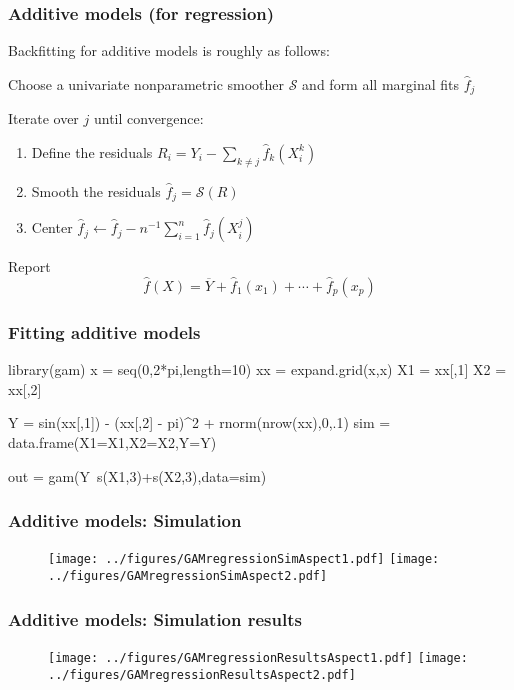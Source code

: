 \documentclass[12pt]{beamer}
\begin{document}
\begin{frame}[fragile]
\frametitle{Additive models (for regression)}
Backfitting for additive models is roughly as follows:

\vsp
Choose a univariate nonparametric smoother $\mathcal{S}$ and form all marginal fits $\hat{f}_j$


\vsp
Iterate over $j$ until convergence:
\begin{enumerate}
\item Define the residuals $R_i = Y_i - \sum_{k \neq j} \hat{f}_k(X_{i}^k)$
\item Smooth the residuals $\hat{f}_j = \mathcal{S}(R)$
\item Center $\hat{f}_j \leftarrow \hat{f}_j - n^{-1}\sum_{i=1}^n \hat{f}_j(X_{i}^j)$
\end{enumerate}
Report
\[
\hat{f}(X) = \overline{Y} + \hat{f}_1(x_1)+\cdots+ \hat{f}_p(x_p)
\]
\end{frame}

\begin{frame}[fragile]
\frametitle{Fitting additive models }
\begin{blockcode}
library(gam)
x   = seq(0,2*pi,length=10)
xx = expand.grid(x,x)
X1 = xx[,1]
X2 = xx[,2]

Y =  sin(xx[,1]) - (xx[,2] - pi)^2 + rnorm(nrow(xx),0,.1)
sim = data.frame(X1=X1,X2=X2,Y=Y)

out = gam(Y~s(X1,3)+s(X2,3),data=sim)
\end{blockcode}
\end{frame}



\begin{frame}[fragile]
\frametitle{Additive models: Simulation}
\begin{figure}
\centering
\texttt{[image: ../figures/GAMregressionSimAspect1.pdf]}
\texttt{[image: ../figures/GAMregressionSimAspect2.pdf]}
\end{figure}

\end{frame}


\begin{frame}[fragile]
\frametitle{Additive models: Simulation results}
\begin{figure}
\centering
\texttt{[image: ../figures/GAMregressionResultsAspect1.pdf]}
\texttt{[image: ../figures/GAMregressionResultsAspect2.pdf]}
\end{figure}
\end{frame}
\end{document}

